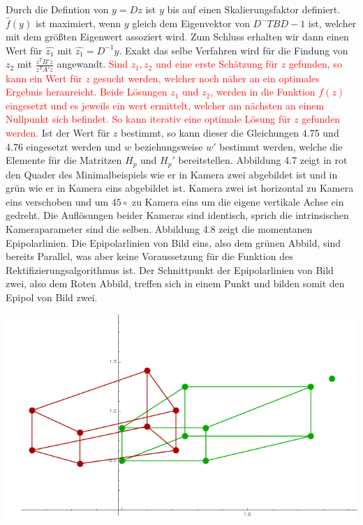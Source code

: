 Durch die Defintion von $y = Dz$ ist $y$ bis auf einen Skalierungsfaktor definiert. $\hat{f}(y)$ ist maximiert, wenn $y$ gleich dem Eigenvektor von $D^-TBD-1$ ist, welcher mit dem größten Eigenwert assoziert wird. Zum Schluss erhalten wir dann einen Wert für $\hat{z_1}$ mit $\hat{z_1} = D^{-1}y$. Exakt das selbe Verfahren wird für die Findung von $z_2$ mit  $\frac{z^TB'z}{z^TA'z}$ angewandt. \textcolor{red}{Sind $z_1, z_2$ und eine erste Schätzung für $z$ gefunden, so kann ein Wert für $z$ gesucht werden, welcher noch näher an ein optimales Ergebnis heranreicht. Beide Lösungen $z_1$ und $z_2$, werden in die Funktion $f(z)$ eingesetzt und es jeweils ein wert ermittelt, welcher am nächsten an einem Nullpunkt sich befindet. So kann iterativ eine optimale Lösung für $z$ gefunden werden.} Ist der Wert für $z$ bestimmt, so kann dieser die Gleichungen 4.75 und 4.76 eingesetzt werden und $w$ beziehungsweise $w'$ bestimmt werden, welche die Elemente für die Matritzen $H_p$ und $H_p'$ bereitstellen.
Abbildung 4.7 zeigt in rot den Quader des Minimalbeispiels wie er in Kamera zwei abgebildet ist und in grün wie er in Kamera eins abgebildet ist. Kamera zwei ist horizontal zu Kamera eins verschoben und um $45\circ$ zu Kamera eins um die eigene vertikale Achse ein gedreht. Die Auflösungen beider Kameras sind identisch, sprich die intrinsischen Kameraparameter sind die selben. Abbildung 4.8 zeigt die momentanen Epipolarlinien. Die Epipolarlinien von Bild eins, also dem grünen Abbild, sind bereits Parallel, was aber keine Voraussetzung für die Funktion des Rektifizierungsalgorithmus ist. Der Schnittpunkt der Epipolarlinien von Bild zwei, also dem Roten Abbild, treffen sich in einem Punkt und bilden somit den Epipol von Bild zwei. 

\begin{minipage}{\linewidth}
	\centering
	\includegraphics[width=.8\linewidth]{images/Rectification_one_same_Solutions.png}
\end{minipage}\\ 

